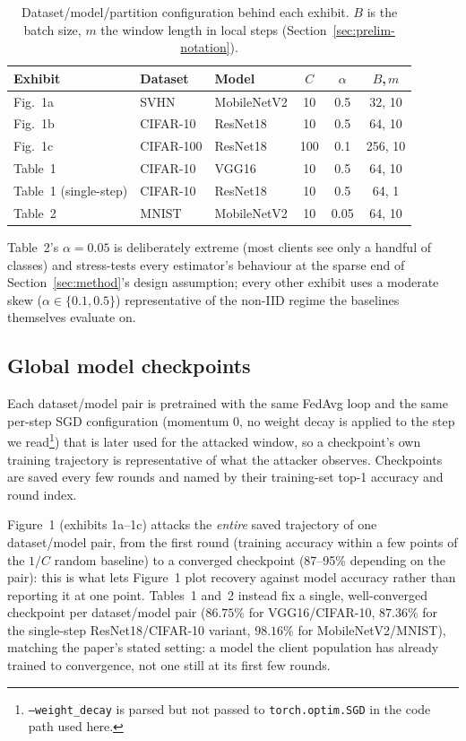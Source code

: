\begin{table}[t]
\centering
\caption{Dataset/model/partition configuration behind each exhibit. $B$ is
the batch size, $m$ the window length in local steps
(Section~\ref{sec:prelim-notation}).}
\label{tab:exhibits}
\footnotesize
\setlength{\tabcolsep}{3pt}
\begin{tabular}{@{}l l l c c c@{}}
\toprule
Exhibit & Dataset & Model & $C$ & $\alpha$ & $B$,\,$m$ \\
\midrule
Fig.~1a & SVHN & MobileNetV2 & 10 & 0.5 & 32, 10 \\
Fig.~1b & CIFAR-10 & ResNet18 & 10 & 0.5 & 64, 10 \\
Fig.~1c & CIFAR-100 & ResNet18 & 100 & 0.1 & 256, 10 \\
Table~1 & CIFAR-10 & VGG16 & 10 & 0.5 & 64, 10 \\
Table~1 (single-step) & CIFAR-10 & ResNet18 & 10 & 0.5 & 64, 1 \\
Table~2 & MNIST & MobileNetV2 & 10 & 0.05 & 64, 10 \\
\bottomrule
\end{tabular}
\end{table}

Table~2's $\alpha=0.05$ is deliberately extreme (most clients see only a
handful of classes) and stress-tests every estimator's behaviour at the
sparse end of Section~\ref{sec:method}'s design assumption; every other
exhibit uses a moderate skew ($\alpha \in \{0.1, 0.5\}$) representative of
the non-IID regime the baselines themselves evaluate on.

\subsection{Global model checkpoints}
\label{sec:eval-checkpoints}

Each dataset/model pair is pretrained with the same FedAvg loop and the
same per-step SGD configuration (momentum $0$, no weight decay is applied
to the step we read\footnote{\texttt{--weight\_decay} is parsed but not
passed to \texttt{torch.optim.SGD} in the code path used here.}) that is
later used for the attacked window, so a checkpoint's own training
trajectory is representative of what the attacker observes. Checkpoints
are saved every few rounds and named by their training-set top-1 accuracy
and round index.

Figure~1 (exhibits 1a--1c) attacks the \emph{entire} saved trajectory of
one dataset/model pair, from the first round (training accuracy within a
few points of the $1/C$ random baseline) to a converged checkpoint
(87--95\% depending on the pair): this is what lets Figure~1 plot recovery
against model accuracy rather than reporting it at one point. Tables~1
and~2 instead fix a single, well-converged checkpoint per dataset/model
pair ($86.75\%$ for VGG16/CIFAR-10, $87.36\%$ for the single-step
ResNet18/CIFAR-10 variant, $98.16\%$ for MobileNetV2/MNIST), matching the
paper's stated setting: a model the client population has already trained
to convergence, not one still at its first few rounds.


